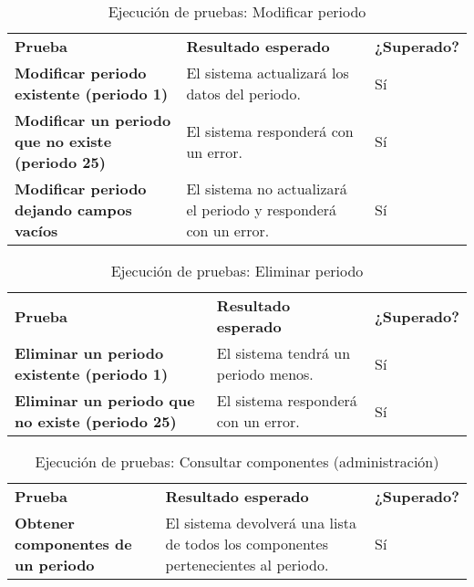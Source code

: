 \begin{table}[H]
\vspace{-4mm}
  \centering
  \caption{Ejecución de pruebas: Modificar periodo}
    \begin{tabular}{p{10em}p{21em}p{5em}}
    \toprule
    \rowcolor[rgb]{ .851,  .886,  .953} \multicolumn{3}{p{36em}}{\textbf{Modificar periodo}} \\ \midrule
    \rowcolor[rgb]{ .949,  .949,  .949} \textbf{Prueba} & \textbf{Resultado esperado} & \textbf{¿Superado?} \\ \midrule
    \textbf{Modificar periodo existente (periodo 1)} & El sistema actualizará los datos del periodo. & Sí  \\ \midrule
    \textbf{Modificar un periodo que no existe (periodo 25)} & El sistema responderá con un error.  & Sí \\ \midrule
    \textbf{Modificar periodo dejando campos vacíos} & El sistema no actualizará el periodo y responderá con un error.  & Sí \\ \bottomrule
    \end{tabular}%
\end{table}%
\begin{table}[H]
\vspace{-4mm}
  \centering
  \caption{Ejecución de pruebas: Eliminar periodo}
    \begin{tabular}{p{11em}p{20em}p{5em}}
    \toprule
    \rowcolor[rgb]{ .851,  .886,  .953} \multicolumn{3}{p{36em}}{\textbf{Eliminar periodo}} \\ \midrule
    \rowcolor[rgb]{ .949,  .949,  .949} \textbf{Prueba} & \textbf{Resultado esperado} & \textbf{¿Superado?} \\ \midrule
    \textbf{Eliminar un periodo existente (periodo 1)} & El sistema tendrá un periodo menos.  & Sí \\ \midrule
    \textbf{Eliminar un periodo que no existe (periodo 25)} & El sistema responderá con un error.  & Sí \\ \bottomrule
    \end{tabular}%
\end{table}%
\begin{table}[H]
\vspace{-4mm}
  \centering
  \caption{Ejecución de pruebas: Consultar componentes (administración)}
    \begin{tabular}{p{11em}p{20em}p{5em}}
    \toprule
    \rowcolor[rgb]{ .851,  .886,  .953} \multicolumn{3}{p{36em}}{\textbf{Consultar componentes (administración)}} \\ \midrule
    \rowcolor[rgb]{ .949,  .949,  .949} \textbf{Prueba} & \textbf{Resultado esperado} & \textbf{¿Superado?} \\ \midrule
    \textbf{Obtener componentes de un periodo} & El sistema devolverá una lista de todos los componentes pertenecientes al periodo.  & Sí \\ \bottomrule
    \end{tabular}%
\end{table}%
